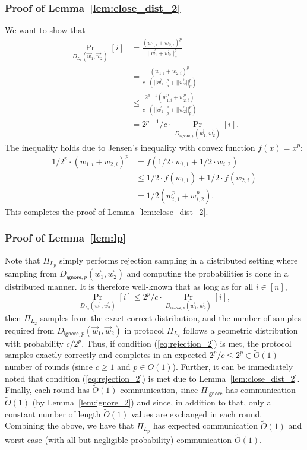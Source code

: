 \subsubsection{Proof of Lemma~\ref{lem:close_dist_2}}\label{apx:pfLemma5}
We want to show that
\begin{align*}
    \Pr_{D_{L_p}(\vec{w}_1, \vec{w}_2)}[i] &= \frac{(w_{1,i} + w_{2,i})^p}{||\vec{w}_1 + \vec{w}_2||_p^p}\\
   &= \frac{(w_{1,i} + w_{2,i})^p}{c \cdot (||\vec{w}_1||_p^p  + ||\vec{w}_2||_p^p)}\\
    &\leq \frac{2^{p-1} (w^p_{1,i} + w^p_{2,i})}{c \cdot (||\vec{w}_1||_p^p  + ||\vec{w}_2||_p^p)}\\
    &= 2^{p-1}/c \cdot \Pr_{D_{\mathsf{ignore}, p}(\vec{w}_1, \vec{w}_2)}[i].
\end{align*}
The inequality holds due to Jensen's inequality with convex function $f(x) = x^p$:
\begin{align*}
1/2^p \cdot(w_{1,i} + w_{2,i})^p & = f(1/2 \cdot w_{i,1} + 1/2 \cdot w_{i,2}) \\
& \le 1/2 \cdot f(w_{i,1}) +  1/2 \cdot f(w_{2,i}) \\
& = 1/2 (w_{i,1}^p + w_{i,2}^p). 
\end{align*}
This completes the proof of Lemma~\ref{lem:close_dist_2}.
 

\subsubsection{Proof of Lemma~\ref{lem:lp}}\label{apx:pfLemma6}
Note that $\Pi_{L_p}$ simply performs rejection sampling in a distributed setting where sampling from $D_{\mathsf{ignore}, p}(\vec{w}_1, \vec{w}_2)$ and computing the probabilities is done in a distributed manner. It is therefore well-known that
as long as for all $i \in [n]$,
\begin{equation} \label{eq:rejection_2}
    \Pr_{D_{L_p}(\vec{w}_1, \vec{w}_2)}[i] \leq 2^p/c \cdot \Pr_{D_{\mathsf{ignore}, p}(\vec{w}_1, \vec{w}_2)}[i],
\end{equation}
then $\Pi_{L_2}$ samples from the exact correct distribution, and
the number of samples required from $D_{\mathsf{ignore}, p}(\vec{w}_1, \vec{w}_2)$ in protocol $\Pi_{L_2}$ follows a geometric distribution with probability $c/2^p$.
Thus, if condition (\ref{eq:rejection_2}) is met, the protocol 
samples exactly correctly and completes in an expected $2^p/c \leq 2^p \in \tilde{O}(1)$ number of rounds (since $c \geq 1$ and $p \in O(1)$).
Further, it can be immediately noted that condition (\ref{eq:rejection_2}) is met due to Lemma~\ref{lem:close_dist_2}.
Finally, each round has $\tilde{O}(1)$ communication, since $\Pi_{\mathsf{ignore}}$ has communication $\tilde{O}(1)$ (by Lemma~\ref{lem:ignore_2})
and since, in addition to that, only a constant number of length $\tilde{O}(1)$ values are exchanged in each round.
Combining the above, we have that $\Pi_{L_p}$ has expected
communication $\tilde{O}(1)$
and worst case (with all but negligible probability) communication $\tilde{O}(1)$.

